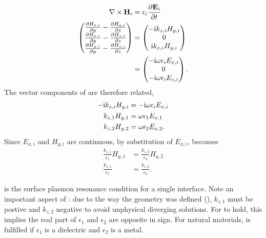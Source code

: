 \begin{align}
\nabla \times \mathbf{H}_i &= \epsilon_i \frac{\partial \mathbf{E}_i}{\partial t}\\
\begin{pmatrix}
\frac{\partial H_{z,i}}{\partial y} - \frac{\partial H_{y,i}}{\partial z}\\
\frac{\partial H_{x,i}}{\partial y} - \frac{\partial H_{z,i}}{\partial z}\\
\frac{\partial H_{y,i}}{\partial y} - \frac{\partial H_{x,i}}{\partial z}
\end{pmatrix}
&= \begin{pmatrix}
-{\mathrm{i}} k_{z,i} H_{y,i}\\
0\\
{\mathrm{i}} k_{x,i} H_{y,i}
\end{pmatrix}
\\
&= \begin{pmatrix}
-{\mathrm{i}} \omega \epsilon_i E_{x,i}\\
0\\
-{\mathrm{i}} \omega \epsilon_i E_{z,i}
\end{pmatrix}.
\label{eqn:vectordisp}
\end{align}
The vector components of  are therefore related,
\begin{align}
-{\mathrm{i}} k_{z,i} H_{y,i} &= -{\mathrm{i}} \omega \epsilon_i E_{x,i}\\
k_{z,1} H_{y,1} &= \omega \epsilon_1 E_{x,1}\\
k_{z,2} H_{y,2} &= \omega \epsilon_2 E_{x,2}.
\label{eqn:spderivsteptwo}
\end{align}
Since $E_{x,i}$ and $H_{y,i}$ are continuous,
by substitution of $E_{x,i}$,  becomes
\begin{align}
\frac{k_{z,1}}{\epsilon_1}H_{y,1}&=\frac{k_{z,2}}{\epsilon_2}H_{y,2}\\ 
\frac{k_{z,1}}{\epsilon_1}&=\frac{k_{z,2}}{\epsilon_2}.
\label{eqn:sprcondition}
\end{align}

 is the surface plasmon resonance condition for
a single interface.  Note an important aspect of
:  due to the way the geometry was defined
(), $k_{z,1}$ must be postive and $k_{z,2}$
negative to avoid unphysical diverging solutions.  For
 to hold, this implies the real part of
$\epsilon_1$ and $\epsilon_2$ are opposite in sign.  For natural materials,
 is fulfilled if $\epsilon_1$ is a dielectric
and $\epsilon_2$ is a metal.
